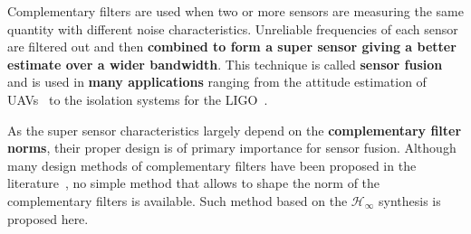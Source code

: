
Complementary filters are used when two or more sensors are measuring the same quantity with different noise characteristics.
Unreliable frequencies of each sensor are filtered out and then \textbf{combined to form a super sensor giving a better estimate over a wider bandwidth}.
This technique is called \textbf{sensor fusion} and is used in \textbf{many applications} ranging from the attitude estimation of UAVs~\cite{zimmermann92_high_bandw_orien_measur_contr} to the isolation systems for the LIGO~\cite{matichard15_seism_isolat_advan_ligo}.

As the super sensor characteristics largely depend on the \textbf{complementary filter norms}, their proper design is of primary importance for sensor fusion.
Although many design methods of complementary filters have been proposed in the
literature~\cite{jensen13_basic_uas,hua04_polyp_fir_compl_filter_contr_system},
no simple method that allows to shape the norm of the complementary filters is
available. Such method based on the $\mathcal{H}_\infty$ synthesis is proposed here.